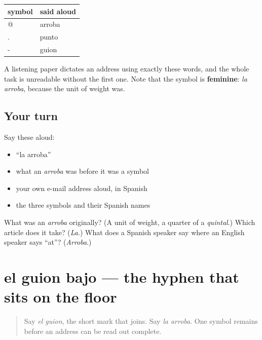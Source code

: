 \begin{grammarlens}[title={Grammar Lens: reading an address aloud}]
\noindent
\begin{tabularx}{\linewidth}{@{}>{\raggedright\arraybackslash}X>{\raggedright\arraybackslash}X@{}}
\toprule
\textbf{symbol} & \textbf{said aloud} \\
\midrule
@ & arroba \\
. & punto \\
- & guion \\
\bottomrule
\end{tabularx}

A listening paper dictates an address using exactly these words, and the whole task is unreadable without the first one. Note that the symbol is \textbf{feminine}: \emph{la arroba}, because the unit of weight was.
\end{grammarlens}

\subsection*{Your turn}
Say these aloud:

\begin{itemize}
\raggedright
  \item \textquotedblleft{}la arroba\textquotedblright{}
  \item what an \emph{arroba} was before it was a symbol
  \item your own e-mail address aloud, in Spanish
  \item the three symbols and their Spanish names
\end{itemize}

\begin{tcolorbox}[breakable,colback=teal!4,colframe=teal!35!black,title={Before you move on}]
What was an \emph{arroba} originally? (A unit of weight, a quarter of a \emph{quintal}.) Which article does it take? (\emph{La}.) What does a Spanish speaker say where an English speaker says \textquotedblleft{}at\textquotedblright{}? (\emph{Arroba}.)
\end{tcolorbox}
\section[el guion bajo]{el guion bajo — the hyphen that sits on the floor}

\label{lesson:ES-C428-guion-bajo}



\begin{quote}
Say \emph{el guion}, the short mark that joins. Say \emph{la arroba}. One symbol remains before an address can be read out complete.
\end{quote}

